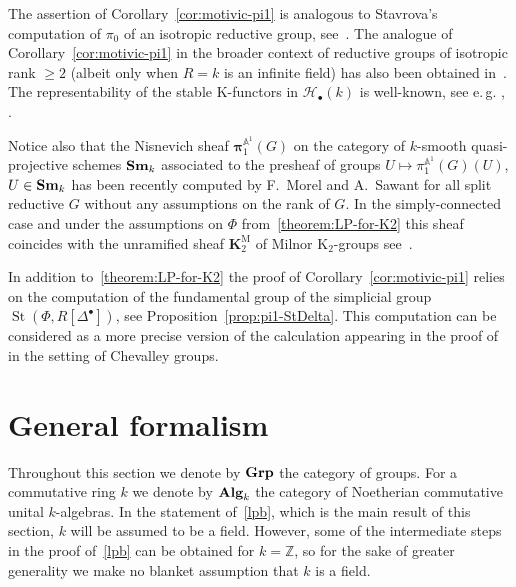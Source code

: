 \documentclass[oneside, 11pt]{amsart}
\numberwithin{equation}{section}
\newcommand{\K}{{\mathrm{K}}}
\newcommand{\St}{\mathop{\mathrm{St}}\nolimits}
\theoremstyle{definition}
\theoremstyle{definition}
\theoremstyle{remark}
\newcommand{\ZZ}{\mathbb{Z}}
\newcommand{\catname}[1]{{\normalfont\textbf{#1}}} %
\begin{document}
The assertion of Corollary~\ref{cor:motivic-pi1} is analogous to Stavrova's computation of $\pi_0$ of an isotropic reductive group, see~\cite[Theorem~5.5]{Sta20}. The analogue of Corollary~\ref{cor:motivic-pi1} in the broader context of reductive groups of isotropic rank $\geq 2$ (albeit only when $R = k$ is an infinite field) has also been obtained in~\cite{VW16}.
The representability of the stable $\K$-functors in $\mathscr{H}_\bullet(k)$ is well-known, see e.\,g. \cite[Corollary~3.4]{Ho05}, \cite[\S~4.3]{MV99}.

Notice also that the Nisnevich sheaf $\bm{\pi}_1^{\mathbb{A}^1}(G)$ on the category of $k$-smooth quasi-projective schemes $\catname{Sm}_k$ associated to the presheaf of groups $U \mapsto \pi_1^{\mathbb{A}^1}(G)(U)$, $U\in\catname{Sm}_k$ has been recently computed by F.~Morel and A.~Sawant for all split reductive $G$ without any assumptions on the rank of $G$. In the simply-connected case and under the assumptions on $\Phi$ from~\cref{theorem:LP-for-K2} this sheaf coincides with the unramified sheaf $\mathbf{K}_2^\mathrm{M}$ of Milnor $\K_2$-groups see~\cite[Theorem~1]{MS20}. 

In addition to~\cref{theorem:LP-for-K2} the proof of Corollary~\ref{cor:motivic-pi1} relies on the computation of the fundamental group of the simplicial group $\St(\Phi, R[\Delta^\bullet])$, see Proposition~\ref{prop:pi1-StDelta}. This computation can be considered as a more precise version of the calculation appearing in the proof of~\cite[Proposition~3.2]{VW16} in the setting of Chevalley groups.















\section{General formalism}
Throughout this section we denote by $\catname{Grp}$ the category of groups. For a commutative ring $k$ we denote by $\catname{Alg}_k$ the category of Noetherian commutative unital $k$-algebras. In the statement of~\cref{lpb}, which is the main result of this section, $k$ will be assumed to be a field. However, some of the intermediate steps in the proof of~\cref{lpb} can be obtained for $k=\ZZ$, so for the sake of greater generality we make no blanket assumption that $k$ is a field.  
\end{document}
